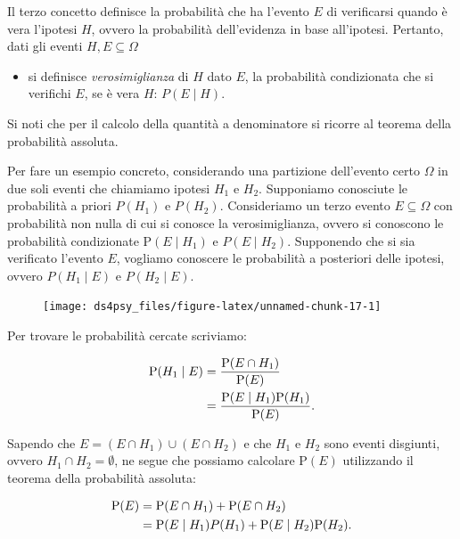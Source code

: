 \documentclass[
  11pt,
]{krantz}
\providecommand{\tightlist}{%
  \setlength{\itemsep}{0pt}\setlength{\parskip}{0pt}}
\theoremstyle{definition}
\theoremstyle{definition}
\theoremstyle{definition}
\theoremstyle{definition}
\theoremstyle{remark}
\begin{document}
Il terzo concetto definisce la probabilità che ha l'evento \(E\) di verificarsi quando è vera l'ipotesi \(H\), ovvero la probabilità dell'evidenza in base all'ipotesi. Pertanto, dati gli eventi \(H, E \subseteq \Omega\)

\begin{itemize}
\tightlist
\item
  si definisce \emph{verosimiglianza} di \(H\) dato \(E\), la probabilità condizionata che si verifichi \(E\), se è vera \(H\): \(P (E \mid H)\).
\end{itemize}

Si noti che per il calcolo della quantità a denominatore si ricorre al teorema della probabilità assoluta.

Per fare un esempio concreto, considerando una partizione dell'evento certo \(\Omega\) in due soli eventi che chiamiamo ipotesi \(H_1\) e \(H_2\). Supponiamo conosciute le probabilità a priori \(P(H_1)\) e \(P(H_2)\). Consideriamo un terzo evento \(E \subseteq \Omega\) con probabilità non nulla di cui si conosce la verosimiglianza, ovvero si conoscono le probabilità condizionate \({\mbox{P}}(E \mid H_1)\) e \(P(E \mid H_2)\). Supponendo che si sia verificato l'evento \(E\), vogliamo conoscere le probabilità a posteriori delle ipotesi, ovvero \(P(H_1 \mid E)\) e \(P(H_2 \mid E)\).

\begin{figure}

{\centering \texttt{[image: ds4psy\_files/figure-latex/unnamed-chunk-17-1]} 

}

\end{figure}

Per trovare le probabilità cercate scriviamo:

\[
\begin{split}
{\mbox{P}}(H_1 \mid E) &= \frac{{\mbox{P}}(E \cap H_1)}{{\mbox{P}}(E)}\notag\\
              &= \frac{{\mbox{P}}(E \mid H_1){\mbox{P}}(H_1)}{{\mbox{P}}(E)}.
\end{split}
\]

Sapendo che \(E = (E \cap H_1) \cup (E \cap H_2)\) e che \(H_1\) e \(H_2\) sono eventi disgiunti, ovvero \(H_1 \cap H_2 = \emptyset\), ne segue che possiamo calcolare \({\mbox{P}}(E)\) utilizzando il teorema della probabilità assoluta:

\[
\begin{split}
{\mbox{P}}(E) &= {\mbox{P}}(E \cap H_1) + {\mbox{P}}(E \cap H_2)\notag\\
     &= {\mbox{P}}(E \mid H_1)P(H_1) + {\mbox{P}}(E \mid H_2){\mbox{P}}(H_2).
\end{split}
\]
\end{document}

